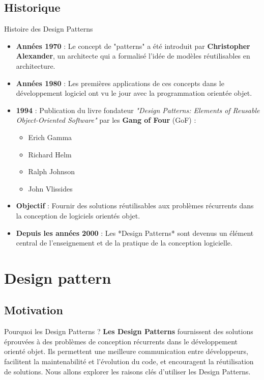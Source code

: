 \documentclass[aspectratio=169]{beamer}
\begin{document}
    \subsection{Historique}
        \begin{frame}{Histoire des Design Patterns}
            \begin{itemize}
                \item \textbf{Années 1970} : Le concept de "patterns" a été introduit par \textbf{Christopher Alexander}, un architecte qui a formalisé l'idée de modèles réutilisables en architecture.
                \item \textbf{Années 1980} : Les premières applications de ces concepts dans le développement logiciel ont vu le jour avec la programmation orientée objet.
                \item \textbf{1994} : Publication du livre fondateur \textit{"Design Patterns: Elements of Reusable Object-Oriented Software"} par les \textbf{Gang of Four} (GoF) :
                    \begin{itemize}
                        \item Erich Gamma
                        \item Richard Helm
                        \item Ralph Johnson
                        \item John Vlissides
                    \end{itemize}
                \item \textbf{Objectif} : Fournir des solutions réutilisables aux problèmes récurrents dans la conception de logiciels orientés objet.
                \item \textbf{Depuis les années 2000} : Les *Design Patterns* sont devenus un élément central de l'enseignement et de la pratique de la conception logicielle.
            \end{itemize}
        \end{frame}

\section{Design pattern}
    \subsection{Motivation}
        \begin{frame}{Pourquoi les Design Patterns ?}
            \textbf{Les Design Patterns} fournissent des solutions éprouvées à des problèmes de conception récurrents dans le développement orienté objet. Ils permettent une meilleure communication entre développeurs, facilitent la maintenabilité et l'évolution du code, et encouragent la réutilisation de solutions. Nous allons explorer les raisons clés d'utiliser les Design Patterns.
        \end{frame}
\end{document}
